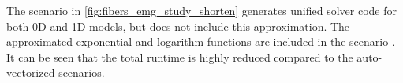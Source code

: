The scenario  in \cref{fig:fibers_emg_study_shorten} generates unified solver code for both 0D and 1D models, but does not include this approximation. The approximated exponential and logarithm functions are included in the scenario . It can be seen that the total runtime is highly reduced compared to the auto-vectorized scenarios.








